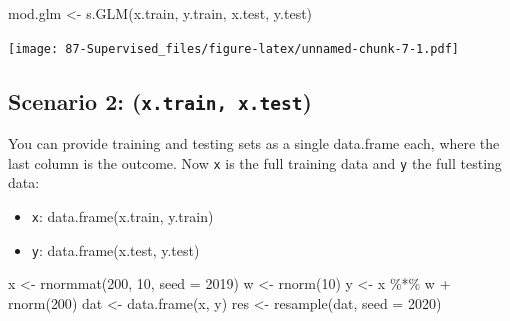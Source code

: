 \documentclass[
]{book}
\newenvironment{Shaded}{\begin{snugshade}}{\end{snugshade}}
\newcommand{\AttributeTok}[1]{\textcolor[rgb]{0.77,0.63,0.00}{#1}}
\newcommand{\DecValTok}[1]{\textcolor[rgb]{0.00,0.00,0.81}{#1}}
\newcommand{\FunctionTok}[1]{\textcolor[rgb]{0.00,0.00,0.00}{#1}}
\newcommand{\NormalTok}[1]{#1}
\newcommand{\OtherTok}[1]{\textcolor[rgb]{0.56,0.35,0.01}{#1}}
\newcommand{\SpecialCharTok}[1]{\textcolor[rgb]{0.00,0.00,0.00}{#1}}
\providecommand{\tightlist}{%
  \setlength{\itemsep}{0pt}\setlength{\parskip}{0pt}}
\begin{document}
\begin{Shaded}
\begin{Highlighting}[]
\NormalTok{mod.glm }\OtherTok{\textless{}{-}} \FunctionTok{s.GLM}\NormalTok{(x.train, y.train, x.test, y.test)}
\end{Highlighting}
\end{Shaded}

\texttt{[image: 87-Supervised\_files/figure-latex/unnamed-chunk-7-1.pdf]}

\hypertarget{scenario-2-x.train-x.test}{%
\subsection{\texorpdfstring{Scenario 2: (\texttt{x.train,\ x.test})}{Scenario 2: (x.train, x.test)}}\label{scenario-2-x.train-x.test}}

You can provide training and testing sets as a single data.frame each, where the last column is the outcome. Now \texttt{x} is the full training data and \texttt{y} the full testing data:

\begin{itemize}
\tightlist
\item
  \texttt{x}: data.frame(x.train, y.train)
\item
  \texttt{y}: data.frame(x.test, y.test)
\end{itemize}

\begin{Shaded}
\begin{Highlighting}[]
\NormalTok{x }\OtherTok{\textless{}{-}} \FunctionTok{rnormmat}\NormalTok{(}\DecValTok{200}\NormalTok{, }\DecValTok{10}\NormalTok{, }\AttributeTok{seed =} \DecValTok{2019}\NormalTok{)}
\NormalTok{w }\OtherTok{\textless{}{-}} \FunctionTok{rnorm}\NormalTok{(}\DecValTok{10}\NormalTok{)}
\NormalTok{y }\OtherTok{\textless{}{-}}\NormalTok{ x }\SpecialCharTok{\%*\%}\NormalTok{ w }\SpecialCharTok{+} \FunctionTok{rnorm}\NormalTok{(}\DecValTok{200}\NormalTok{)}
\NormalTok{dat }\OtherTok{\textless{}{-}} \FunctionTok{data.frame}\NormalTok{(x, y)}
\NormalTok{res }\OtherTok{\textless{}{-}} \FunctionTok{resample}\NormalTok{(dat, }\AttributeTok{seed =} \DecValTok{2020}\NormalTok{)}
\end{Highlighting}
\end{Shaded}

\begin{Shaded}
\end{Shaded}
\end{document}
